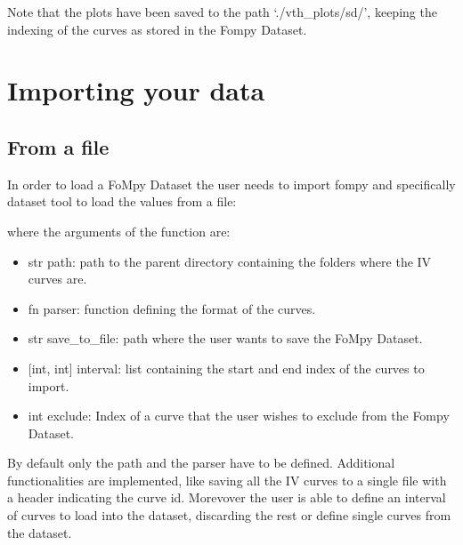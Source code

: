 \documentclass[letterpaper,10pt,english,openany, oneside]{sphinxmanual}
\begin{document}
Note that the plots have been saved to the path ‘./vth\_plots/sd/’, keeping the indexing of the curves as stored in the Fompy Dataset.


\chapter{Importing your data}
\label{\detokenize{index:importing-your-data}}

\section{From a file}
\label{\detokenize{index:from-a-file}}
In order to load a FoMpy Dataset the user needs to import fompy and specifically dataset tool to load the values from a file:

%
\begin{sphinxVerbatim}[commandchars=\\\{\}]
     
\end{sphinxVerbatim}

where the arguments of the function are:
\begin{itemize}
\item {} 
str path: path to the parent directory containing the folders where the IV curves are.

\item {} 
fn parser: function defining the format of the curves.

\item {} 
str save\_to\_file: path where the user wants to save the FoMpy Dataset.

\item {} 
{[}int, int{]} interval: list containing the start and end index of the curves to import.

\item {} 
int exclude: Index of a curve that the user wishes to exclude from the Fompy Dataset.

\end{itemize}

By default only the path and the parser have to be defined. Additional functionalities are implemented, like saving all the IV curves to a single file with a header
indicating the curve id. Morevover the user is able to define an interval of curves to load into the dataset, discarding the rest or define single curves from the dataset.
\end{document}
